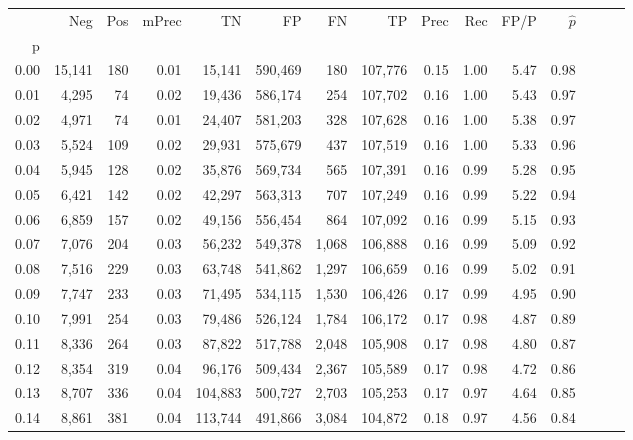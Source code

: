 \begin{tabular}{rrrrrrrrrrrrrrr}
\toprule
{} &     Neg &    Pos & mPrec &       TN &       FP &       FN &       TP &  Prec &   Rec &  FP/P & $\hat{p}$ \\
p    &         &        &       &          &          &          &          &       &       &       &           \\
\midrule
0.00 &  15,141 &    180 &  0.01 &   15,141 &  590,469 &      180 &  107,776 &  0.15 &  1.00 &  5.47 &      0.98 \\
0.01 &   4,295 &     74 &  0.02 &   19,436 &  586,174 &      254 &  107,702 &  0.16 &  1.00 &  5.43 &      0.97 \\
0.02 &   4,971 &     74 &  0.01 &   24,407 &  581,203 &      328 &  107,628 &  0.16 &  1.00 &  5.38 &      0.97 \\
0.03 &   5,524 &    109 &  0.02 &   29,931 &  575,679 &      437 &  107,519 &  0.16 &  1.00 &  5.33 &      0.96 \\
0.04 &   5,945 &    128 &  0.02 &   35,876 &  569,734 &      565 &  107,391 &  0.16 &  0.99 &  5.28 &      0.95 \\
0.05 &   6,421 &    142 &  0.02 &   42,297 &  563,313 &      707 &  107,249 &  0.16 &  0.99 &  5.22 &      0.94 \\
0.06 &   6,859 &    157 &  0.02 &   49,156 &  556,454 &      864 &  107,092 &  0.16 &  0.99 &  5.15 &      0.93 \\
0.07 &   7,076 &    204 &  0.03 &   56,232 &  549,378 &    1,068 &  106,888 &  0.16 &  0.99 &  5.09 &      0.92 \\
0.08 &   7,516 &    229 &  0.03 &   63,748 &  541,862 &    1,297 &  106,659 &  0.16 &  0.99 &  5.02 &      0.91 \\
0.09 &   7,747 &    233 &  0.03 &   71,495 &  534,115 &    1,530 &  106,426 &  0.17 &  0.99 &  4.95 &      0.90 \\
0.10 &   7,991 &    254 &  0.03 &   79,486 &  526,124 &    1,784 &  106,172 &  0.17 &  0.98 &  4.87 &      0.89 \\
0.11 &   8,336 &    264 &  0.03 &   87,822 &  517,788 &    2,048 &  105,908 &  0.17 &  0.98 &  4.80 &      0.87 \\
0.12 &   8,354 &    319 &  0.04 &   96,176 &  509,434 &    2,367 &  105,589 &  0.17 &  0.98 &  4.72 &      0.86 \\
0.13 &   8,707 &    336 &  0.04 &  104,883 &  500,727 &    2,703 &  105,253 &  0.17 &  0.97 &  4.64 &      0.85 \\
0.14 &   8,861 &    381 &  0.04 &  113,744 &  491,866 &    3,084 &  104,872 &  0.18 &  0.97 &  4.56 &      0.84 \\

\end{tabular}
